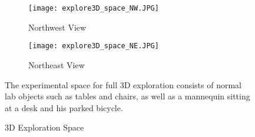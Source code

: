 \begin{figure}[!t]
\centering
    	\begin{subfigure}[t]{0.44\columnwidth}
           	\centering
          	\texttt{[image: explore3D\_space\_NW.JPG]}
        		\caption{Northwest View}
    	\end{subfigure}
	\hspace*{0.05\columnwidth}
    	\begin{subfigure}[t]{0.44\columnwidth}
           	\centering
          	\texttt{[image: explore3D\_space\_NE.JPG]}
        		\caption{Northeast View}
    	\end{subfigure}
	\caption{3D Exploration Space}
	\medskip
	\small
	The experimental space for full 3D exploration consists of normal lab objects such as tables and chairs, as well as a mannequin sitting at a desk and his parked bicycle.
	\label{fig:Full3DExplorationEnvironment}
\end{figure}



